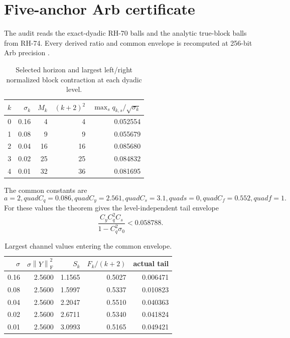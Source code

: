 \documentclass[11pt]{article}
\newcommand{\norm}[1]{\left\lVert#1\right\rVert}
\newcommand{\F}{\mathrm F}
\begin{document}
\section{Five-anchor Arb certificate}

The audit reads the exact-dyadic RH-70 balls and the analytic true-block balls
from RH-74.  Every derived ratio and common envelope is recomputed at 256-bit
Arb precision \citep{Johansson2017}.

\begin{table}[H]
\centering
\small
\caption{Selected horizon and largest left/right normalized block
contraction at each dyadic level.}
\label{tab:q}
\begin{tabular}{@{}rrrrr@{}}
\toprule
$k$ & $\sigma_k$ & $M_k$ & $(k+2)^2$ &
$\max_s q_{k,s}/\sqrt{\sigma_k}$\\
\midrule
0 & 0.16 & 4  & 4  & 0.052554\\
1 & 0.08 & 9  & 9  & 0.055679\\
2 & 0.04 & 16 & 16 & 0.085680\\
3 & 0.02 & 25 & 25 & 0.084832\\
4 & 0.01 & 32 & 36 & 0.081695\\
\bottomrule
\end{tabular}
\end{table}

The common constants are
\begin{equation}
 a=2,quad C_q=0.086,quad C_y=2.561,quad C_s=3.1,quad
 s=0,quad C_f=0.552,quad f=1.
 \label{eq:constants}
\end{equation}
For these values the theorem gives the level-independent tail envelope
\begin{equation}
 \frac{C_yC_q^2C_s}{1-C_q^2\sigma_0}
 <0.058788.
 \label{eq:tail-envelope}
\end{equation}

\begin{table}[H]
\centering
\small
\caption{Largest channel values entering the common envelope.}
\label{tab:inputs}
\begin{tabular}{@{}rrrrr@{}}
\toprule
$\sigma$ & $\sigma\norm Y_{\F}^2$ & $S_k$ & $F_k/(k+2)$ & actual tail\\
\midrule
0.16 & 2.5600 & 1.1565 & 0.5027 & 0.006471\\
0.08 & 2.5600 & 1.5997 & 0.5337 & 0.010823\\
0.04 & 2.5600 & 2.2047 & 0.5510 & 0.040363\\
0.02 & 2.5600 & 2.6711 & 0.5340 & 0.041824\\
0.01 & 2.5600 & 3.0993 & 0.5165 & 0.049421\\
\bottomrule
\end{tabular}
\end{table}
\end{document}
